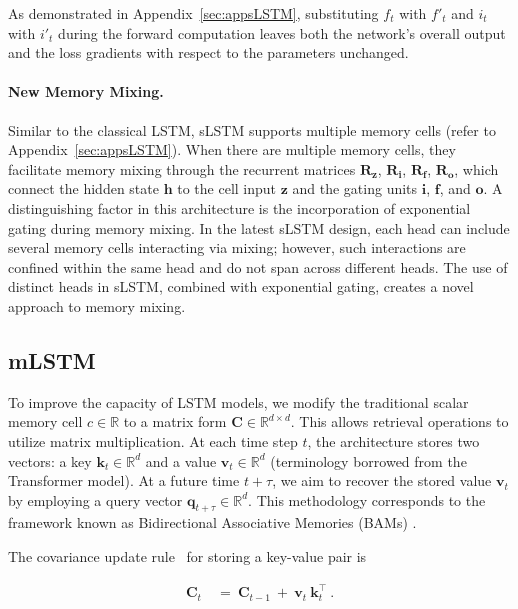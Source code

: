 As demonstrated in Appendix~\ref{sec:appsLSTM}, substituting $f_t$ with $f'_t$ and $i_t$ with $i'_t$ during the forward computation leaves both the network's overall output and the loss gradients with respect to the parameters unchanged.

\paragraph{New Memory Mixing.} Similar to the classical LSTM, sLSTM supports multiple memory cells (refer to Appendix~\ref{sec:appsLSTM}). When there are multiple memory cells, they facilitate memory mixing through the recurrent matrices $\mathbf{R}_{\mathbf{z}}$, $\mathbf{R}_{\mathbf{i}}$, $\mathbf{R}_{\mathbf{f}}$, $\mathbf{R}_{\mathbf{o}}$, which connect the hidden state $\mathbf{h}$ to the cell input $\mathbf{z}$ and the gating units $\mathbf{i}$, $\mathbf{f}$, and $\mathbf{o}$. A distinguishing factor in this architecture is the incorporation of exponential gating during memory mixing. In the latest sLSTM design, each head can include several memory cells interacting via mixing; however, such interactions are confined within the same head and do not span across different heads. The use of distinct heads in sLSTM, combined with exponential gating, creates a novel approach to memory mixing.

\subsection{mLSTM}
\label{sec:mLSTM}

To improve the capacity of LSTM models, we modify the traditional scalar memory cell $c \in \mathbb{R}$ to a matrix form $\mathbf{C} \in \mathbb{R}^{d \times d}$. This allows retrieval operations to utilize matrix multiplication. At each time step $t$, the architecture stores two vectors: a key $\mathbf{k}_t \in \mathbb{R}^d$ and a value $\mathbf{v}_t \in \mathbb{R}^d$ (terminology borrowed from the Transformer model). At a future time $t + \tau$, we aim to recover the stored value $\mathbf{v}_t$ by employing a query vector $\mathbf{q}_{t+\tau} \in \mathbb{R}^d$. This methodology corresponds to the framework known as Bidirectional Associative Memories (BAMs) \citep{Kohonen:72,Anderson:72,Nakano:72,Anderson:77}.

The covariance update rule~\citep{Sejnowski:77,Dayan:91} for storing a key-value pair is

\begin{align}
\mathbf{C}_t \ &= \ \mathbf{C}_{t-1} \ + \ \mathbf{v}_{t} \ \mathbf{k}_t^\top \ .
\end{align}

